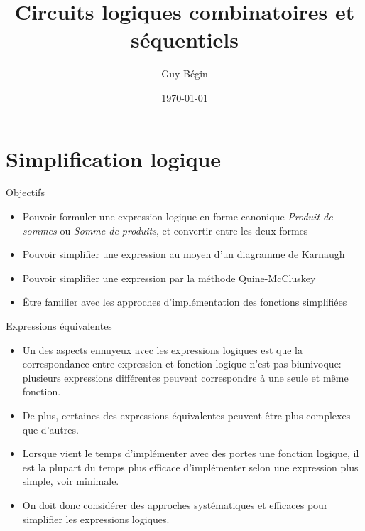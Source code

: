 \documentclass[presentation]{beamer}
\author{Guy Bégin}
\date{\today}
\title{Circuits logiques combinatoires et séquentiels}
\begin{document}
\maketitle

\section{Simplification logique}
\label{sec:org95d99f7}

\begin{frame}[label={sec:orgb603955}]{Objectifs}
\begin{itemize}
\item Pouvoir formuler une expression logique en forme canonique \emph{Produit
de sommes} ou \emph{Somme de produits}, et convertir entre les deux formes
\item Pouvoir simplifier une expression au moyen d'un diagramme de
Karnaugh
\item Pouvoir simplifier une expression par la méthode Quine-McCluskey
\item Être familier avec les approches d'implémentation des fonctions
simplifiées
\end{itemize}
\end{frame}

\begin{frame}[label={sec:orgb8e9229}]{Expressions équivalentes}
\begin{itemize}
\item Un des aspects ennuyeux avec les expressions logiques est que la correspondance entre expression et fonction logique n'est pas biunivoque: plusieurs expressions différentes peuvent correspondre à une seule et même fonction.

\item De plus, certaines des expressions équivalentes peuvent être plus complexes que d'autres.

\item Lorsque vient le temps d'implémenter avec des portes une fonction logique, il est la plupart du temps plus efficace d'implémenter selon une expression plus simple, voir minimale.

\item On doit donc considérer des approches systématiques et efficaces pour simplifier les expressions logiques.
\end{itemize}
\end{frame}
\end{document}
